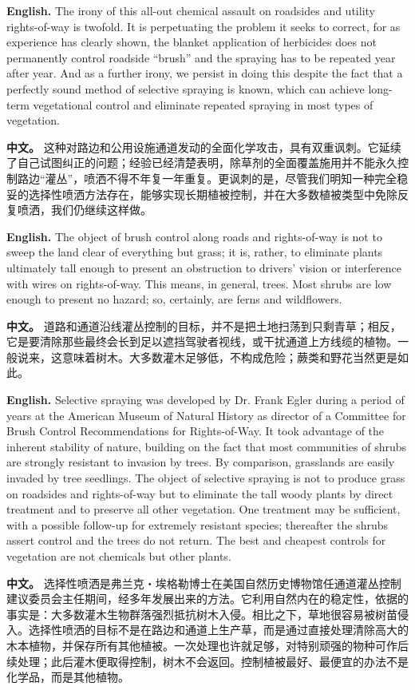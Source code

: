\noindent\textbf{English.} The irony of this all-out chemical assault on roadsides and utility rights-of-way is twofold. It is perpetuating the problem it seeks to correct, for as experience has clearly shown, the blanket application of herbicides does not permanently control roadside ``brush'' and the spraying has to be repeated year after year. And as a further irony, we persist in doing this despite the fact that a perfectly sound method of selective spraying is known, which can achieve long-term vegetational control and eliminate repeated spraying in most types of vegetation.
\par
\noindent\textbf{中文。} 这种对路边和公用设施通道发动的全面化学攻击，具有双重讽刺。它延续了自己试图纠正的问题；经验已经清楚表明，除草剂的全面覆盖施用并不能永久控制路边“灌丛”，喷洒不得不年复一年重复。更讽刺的是，尽管我们明知一种完全稳妥的选择性喷洒方法存在，能够实现长期植被控制，并在大多数植被类型中免除反复喷洒，我们仍继续这样做。
\par\medskip

\noindent\textbf{English.} The object of brush control along roads and rights-of-way is not to sweep the land clear of everything but grass; it is, rather, to eliminate plants ultimately tall enough to present an obstruction to drivers' vision or interference with wires on rights-of-way. This means, in general, trees. Most shrubs are low enough to present no hazard; so, certainly, are ferns and wildflowers.
\par
\noindent\textbf{中文。} 道路和通道沿线灌丛控制的目标，并不是把土地扫荡到只剩青草；相反，它是要清除那些最终会长到足以遮挡驾驶者视线，或干扰通道上方线缆的植物。一般说来，这意味着树木。大多数灌木足够低，不构成危险；蕨类和野花当然更是如此。
\par\medskip

\noindent\textbf{English.} Selective spraying was developed by Dr. Frank Egler during a period of years at the American Museum of Natural History as director of a Committee for Brush Control Recommendations for Rights-of-Way. It took advantage of the inherent stability of nature, building on the fact that most communities of shrubs are strongly resistant to invasion by trees. By comparison, grasslands are easily invaded by tree seedlings. The object of selective spraying is not to produce grass on roadsides and rights-of-way but to eliminate the tall woody plants by direct treatment and to preserve all other vegetation. One treatment may be sufficient, with a possible follow-up for extremely resistant species; thereafter the shrubs assert control and the trees do not return. The best and cheapest controls for vegetation are not chemicals but other plants.
\par
\noindent\textbf{中文。} 选择性喷洒是弗兰克・埃格勒博士在美国自然历史博物馆任通道灌丛控制建议委员会主任期间，经多年发展出来的方法。它利用自然内在的稳定性，依据的事实是：大多数灌木生物群落强烈抵抗树木入侵。相比之下，草地很容易被树苗侵入。选择性喷洒的目标不是在路边和通道上生产草，而是通过直接处理清除高大的木本植物，并保存所有其他植被。一次处理也许就足够，对特别顽强的物种可作后续处理；此后灌木便取得控制，树木不会返回。控制植被最好、最便宜的办法不是化学品，而是其他植物。
\par\medskip

